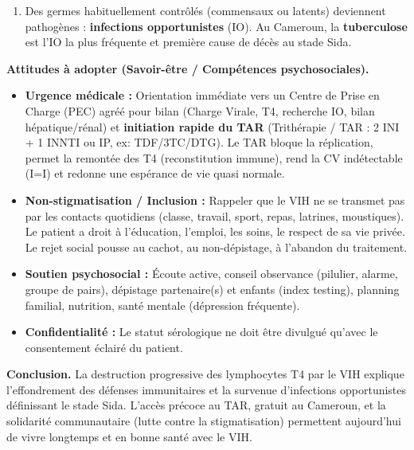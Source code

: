 \documentclass[11pt]{article}
\begin{document}
\begin{exoresolu}
\begin{enumerate}
\begin{itemize}
\item Pas d'aide aux lymphocytes B $\rightarrow$ hypogammaglobulinémie relative, défaut réponse vaccinale.
\item Pas de surveillance tumorale (LTc, NK) $\rightarrow$ Sarcome de Kaposi (HHV-8), Lymphomes (EBV).
\end{itemize}
\item Des germes habituellement contrôlés (commensaux ou latents) deviennent pathogènes : \textbf{infections opportunistes} (IO). Au Cameroun, la \textbf{tuberculose} est l'IO la plus fréquente et première cause de décès au stade Sida.
\end{enumerate}
\textbf{Attitudes à adopter (Savoir-être / Compétences psychosociales).}
\begin{itemize}
\item \textbf{Urgence médicale :} Orientation immédiate vers un Centre de Prise en Charge (PEC) agréé pour bilan (Charge Virale, T4, recherche IO, bilan hépatique/rénal) et \textbf{initiation rapide du TAR} (Trithérapie / TAR : 2 INI + 1 INNTI ou IP, ex: TDF/3TC/DTG). Le TAR bloque la réplication, permet la remontée des T4 (reconstitution immune), rend la CV indétectable (I=I) et redonne une espérance de vie quasi normale.
\item \textbf{Non-stigmatisation / Inclusion :} Rappeler que le VIH ne se transmet pas par les contacts quotidiens (classe, travail, sport, repas, latrines, moustiques). Le patient a droit à l'éducation, l'emploi, les soins, le respect de sa vie privée. Le rejet social pousse au cachot, au non-dépistage, à l'abandon du traitement.
\item \textbf{Soutien psychosocial :} Écoute active, conseil observance (pilulier, alarme, groupe de pairs), dépistage partenaire(s) et enfants (index testing), planning familial, nutrition, santé mentale (dépression fréquente).
\item \textbf{Confidentialité :} Le statut sérologique ne doit être divulgué qu'avec le consentement éclairé du patient.
\end{itemize}
\textbf{Conclusion.} La destruction progressive des lymphocytes T4 par le VIH explique l'effondrement des défenses immunitaires et la survenue d'infections opportunistes définissant le stade Sida. L'accès précoce au TAR, gratuit au Cameroun, et la solidarité communautaire (lutte contre la stigmatisation) permettent aujourd'hui de vivre longtemps et en bonne santé avec le VIH.
\end{exoresolu}
\end{document}
